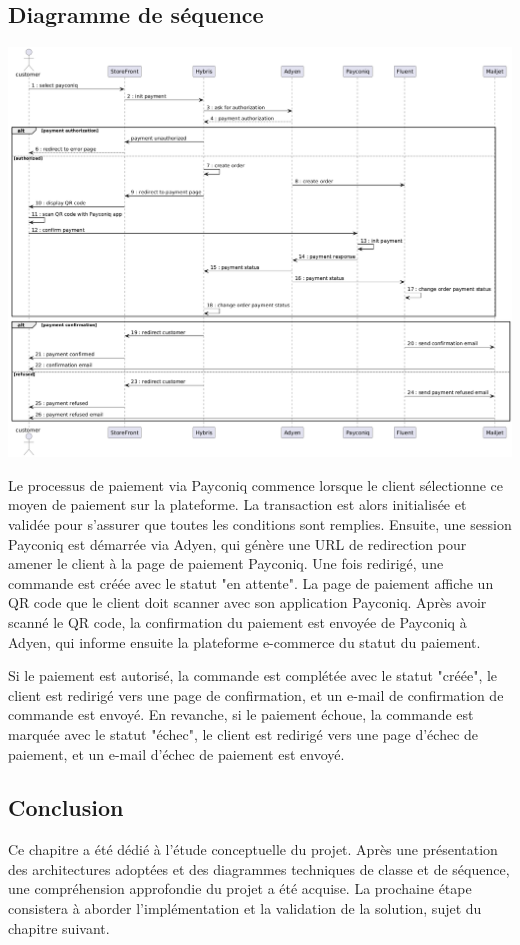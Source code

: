 \subsection{Diagramme de séquence}

\begin{center}
    \centering
    \includegraphics[width=19cm]{Figures/sequence.png}
    \label{fig:processus}
\end{center} 


Le processus de paiement via Payconiq commence lorsque le client sélectionne ce moyen de paiement sur la plateforme. La transaction est alors initialisée et validée pour s'assurer que toutes les conditions sont remplies. Ensuite, une session Payconiq est démarrée via Adyen, qui génère une URL de redirection pour amener le client à la page de paiement Payconiq. Une fois redirigé, une commande est créée avec le statut "en attente". La page de paiement affiche un QR code que le client doit scanner avec son application Payconiq. Après avoir scanné le QR code, la confirmation du paiement est envoyée de Payconiq à Adyen, qui informe ensuite la plateforme e-commerce du statut du paiement.

Si le paiement est autorisé, la commande est complétée avec le statut "créée", le client est redirigé vers une page de confirmation, et un e-mail de confirmation de commande est envoyé. En revanche, si le paiement échoue, la commande est marquée avec le statut "échec", le client est redirigé vers une page d'échec de paiement, et un e-mail d'échec de paiement est envoyé.



\subsection*{Conclusion}

Ce chapitre a été dédié à l’étude conceptuelle du projet. Après une présentation des architectures adoptées et des diagrammes techniques de classe et de séquence, une compréhension approfondie du projet a été acquise. La prochaine étape consistera à aborder l’implémentation et la validation de la solution, sujet du chapitre suivant.
\pagebreak